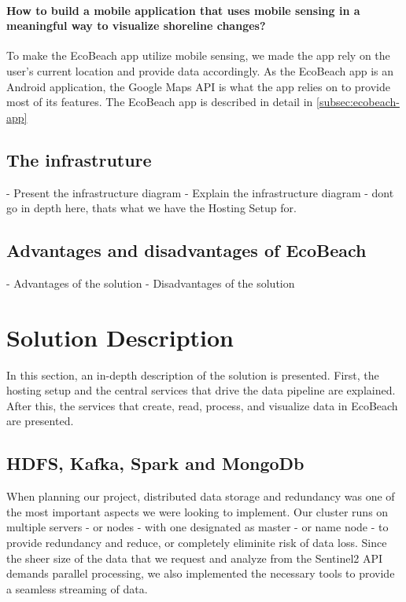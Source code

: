\paragraph{How to build a mobile application that uses mobile sensing in a meaningful way to visualize shoreline changes?} To make the EcoBeach app utilize mobile sensing, we made the app rely on the user's current location and provide data accordingly. As the EcoBeach app is an Android application, the Google Maps API is what the app relies on to provide most of its features. The EcoBeach app is described in detail in \autoref{subsec:ecobeach-app}

\subsection{The infrastruture}\label{subsec:the-infrastructure}
- Present the infrastructure diagram
- Explain the infrastructure diagram
- dont go in depth here, thats what we have the Hosting Setup for.

\subsection{Advantages and disadvantages of EcoBeach}
- Advantages of the solution
- Disadvantages of the solution

\section{Solution Description}

In this section, an in-depth description of the solution is presented. First, the hosting setup and the central services that drive the data pipeline are explained. After this, the services that create, read, process, and visualize data in EcoBeach are presented.

\subsection{HDFS, Kafka, Spark and MongoDb} \label{subsec:the-stack}
When planning our project, distributed data storage and redundancy was one of the most important aspects we were looking to implement.
Our cluster runs on multiple servers - or nodes - with one designated as master - or name node - to provide redundancy and reduce, or completely eliminite risk of data loss.
Since the sheer size of the data that we request and analyze from the Sentinel2 API demands parallel processing, we also implemented the necessary tools to provide a seamless streaming of data.


